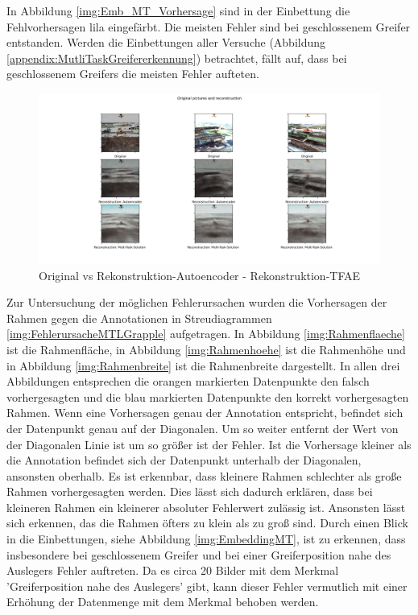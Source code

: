 	In Abbildung \ref{img:Emb_MT_Vorhersage} sind in der Einbettung die Fehlvorhersagen lila eingefärbt. Die meisten Fehler sind bei geschlossenem Greifer entstanden. Werden die Einbettungen aller Versuche (Abbildung \ref{appendix:MutliTaskGreifererkennung}) betrachtet, fällt auf, dass bei geschlossenem Greifers die meisten Fehler aufteten.
	\begin{figure}[h]
		\centering
		\includegraphics[width=1\textwidth, center]{bilder/Hauptteil/MT_Grapple/OriginalPicturesandReconstruction.png}
		\caption{Original vs Rekonstruktion-Autoencoder - Rekonstruktion-TFAE}
		\label{img:RekonstruktionMTAE}
	\end{figure}  	
	Zur Untersuchung der möglichen Fehlerursachen wurden die Vorhersagen der Rahmen gegen die Annotationen in Streudiagrammen \ref{img:FehlerursacheMTLGrapple} aufgetragen. In Abbildung \ref{img:Rahmenflaeche} ist die Rahmenfläche, in Abbildung \ref{img:Rahmenhoehe} ist die Rahmenhöhe und in Abbildung \ref{img:Rahmenbreite} ist die Rahmenbreite dargestellt. In allen drei Abbildungen entsprechen die orangen markierten Datenpunkte den falsch vorhergesagten und die blau markierten Datenpunkte den korrekt vorhergesagten Rahmen. Wenn eine Vorhersagen genau der Annotation entspricht, befindet sich der Datenpunkt genau auf der Diagonalen. Um so weiter entfernt der Wert von der Diagonalen Linie ist um so größer ist der Fehler. Ist die Vorhersage kleiner als die Annotation befindet sich der Datenpunkt unterhalb der Diagonalen, ansonsten oberhalb. Es ist erkennbar, dass kleinere Rahmen schlechter als große Rahmen vorhergesagten werden. Dies lässt sich dadurch erklären, dass bei kleineren Rahmen ein kleinerer absoluter Fehlerwert zulässig ist. Ansonsten lässt sich erkennen, das die Rahmen öfters zu klein als zu groß sind. Durch einen Blick in die Einbettungen, siehe Abbildung \ref{img:EmbeddingMT}, ist zu erkennen, dass insbesondere bei geschlossenem Greifer und bei einer Greiferposition nahe des Auslegers Fehler auftreten. Da es circa 20 Bilder mit dem Merkmal 'Greiferposition nahe des Auslegers' gibt, kann dieser Fehler vermutlich mit einer Erhöhung der Datenmenge mit dem Merkmal behoben werden. 
